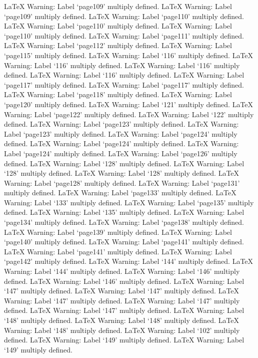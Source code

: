LaTeX Warning: Label `page109' multiply defined.
LaTeX Warning: Label `page109' multiply defined.
LaTeX Warning: Label `page110' multiply defined.
LaTeX Warning: Label `page110' multiply defined.
LaTeX Warning: Label `page110' multiply defined.
LaTeX Warning: Label `page111' multiply defined.
LaTeX Warning: Label `page112' multiply defined.
LaTeX Warning: Label `page115' multiply defined.
LaTeX Warning: Label `116' multiply defined.
LaTeX Warning: Label `116' multiply defined.
LaTeX Warning: Label `116' multiply defined.
LaTeX Warning: Label `116' multiply defined.
LaTeX Warning: Label `page117' multiply defined.
LaTeX Warning: Label `page117' multiply defined.
LaTeX Warning: Label `page118' multiply defined.
LaTeX Warning: Label `page120' multiply defined.
LaTeX Warning: Label `121' multiply defined.
LaTeX Warning: Label `page122' multiply defined.
LaTeX Warning: Label `122' multiply defined.
LaTeX Warning: Label `page123' multiply defined.
LaTeX Warning: Label `page123' multiply defined.
LaTeX Warning: Label `page124' multiply defined.
LaTeX Warning: Label `page124' multiply defined.
LaTeX Warning: Label `page124' multiply defined.
LaTeX Warning: Label `page126' multiply defined.
LaTeX Warning: Label `128' multiply defined.
LaTeX Warning: Label `128' multiply defined.
LaTeX Warning: Label `128' multiply defined.
LaTeX Warning: Label `page128' multiply defined.
LaTeX Warning: Label `page131' multiply defined.
LaTeX Warning: Label `page133' multiply defined.
LaTeX Warning: Label `133' multiply defined.
LaTeX Warning: Label `page135' multiply defined.
LaTeX Warning: Label `135' multiply defined.
LaTeX Warning: Label `page134' multiply defined.
LaTeX Warning: Label `page138' multiply defined.
LaTeX Warning: Label `page139' multiply defined.
LaTeX Warning: Label `page140' multiply defined.
LaTeX Warning: Label `page141' multiply defined.
LaTeX Warning: Label `page141' multiply defined.
LaTeX Warning: Label `page142' multiply defined.
LaTeX Warning: Label `144' multiply defined.
LaTeX Warning: Label `144' multiply defined.
LaTeX Warning: Label `146' multiply defined.
LaTeX Warning: Label `146' multiply defined.
LaTeX Warning: Label `147' multiply defined.
LaTeX Warning: Label `147' multiply defined.
LaTeX Warning: Label `147' multiply defined.
LaTeX Warning: Label `147' multiply defined.
LaTeX Warning: Label `147' multiply defined.
LaTeX Warning: Label `148' multiply defined.
LaTeX Warning: Label `148' multiply defined.
LaTeX Warning: Label `148' multiply defined.
LaTeX Warning: Label `102' multiply defined.
LaTeX Warning: Label `149' multiply defined.
LaTeX Warning: Label `149' multiply defined.
